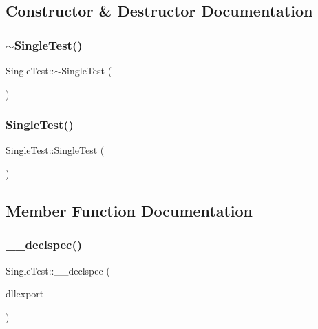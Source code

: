 \subsection{Constructor \& Destructor Documentation}
\mbox{\label{class_single_test_a28ed67f04351e54d43f02e2ce49c762d}} 
\subsubsection{\texorpdfstring{$\sim$SingleTest()}{~SingleTest()}}
{\footnotesize\ttfamily Single\+Test\+::$\sim$\+Single\+Test (\begin{DoxyParamCaption}{ }\end{DoxyParamCaption})}

\mbox{\label{class_single_test_a1b9be20473939c703da97fc27fe896f5}} 
\subsubsection{\texorpdfstring{SingleTest()}{SingleTest()}}
{\footnotesize\ttfamily Single\+Test\+::\+Single\+Test (\begin{DoxyParamCaption}{ }\end{DoxyParamCaption})\hspace{0.3cm}{\ttfamily [private]}}



\subsection{Member Function Documentation}
\mbox{\label{class_single_test_a7ddadb374d069d20b623ca1179b6aa76}} 
\subsubsection{\texorpdfstring{\_\_declspec()}{\_\_declspec()}}
{\footnotesize\ttfamily Single\+Test\+::\+\_\+\+\_\+declspec (\begin{DoxyParamCaption}\item[{dllexport}]{ }\end{DoxyParamCaption})}

